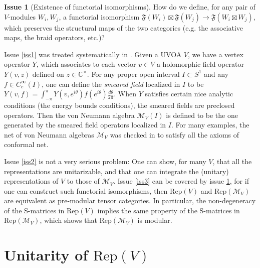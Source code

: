 \documentclass[10pt]{amsart}
\theoremstyle{definition}
\newtheorem{iss}{Issue}[section]
\theoremstyle{plain}
\newcommand{\Rep}{\mathrm{Rep}}
\begin{document}
\begin{iss}[Existence of functorial isomorphisms]\label{iss5}
How do we define, for any pair of $V$-modules $W_i,W_j$, a functorial isomorphism $\mathfrak F(W_i)\boxtimes\mathfrak F(W_j)\rightarrow \mathfrak F(W_i\boxtimes W_j)$, which preserves the structural maps of the two categories (e.g. the associative maps, the braid operators, etc.)?
\end{iss}

Issue \ref{iss1} was treated systematically in \cite{CKLW}. Given a UVOA $V$, we have a vertex operator $Y$, which associates to each vector $v\in V$ a holomorphic field operator $Y(v,z)$ defined on $z\in\mathbb C^\times$. For any proper open interval $I\subset S^1$ and any $f\in C^\infty_c(I)$, one can define the \emph{smeared field} localized in $I$ to be $Y(v,f)=\int_{-\pi}^{\pi} Y(v,e^{i\theta})f(e^{i\theta})\frac{d\theta}{2\pi}$.
When $Y$ satisfies certain nice analytic conditions (the energy bounds conditions), the smeared fields are preclosed operators. Then the von Neumann algebra $\mathcal M_V(I)$ is defined to be the one generated by the smeared field operators localized in $I$. For many examples, the net of von Neumann algebras $\mathcal M_V$ was checked in \cite{CKLW} to satisfy all the axioms of conformal net.

Issue \ref{iss2} is not a very serious problem: One can show, for many  $V$, that all the representations are unitarizable, and that one can integrate the (unitary) representations of $V$ to those of $\mathcal M_V$.  Issue \ref{iss3} can be covered by issue \ref{iss5}, for if one can construct such functorial isomorphisms, then $\Rep(V)$ and $\Rep(\mathcal M_V)$ are equivalent as pre-modular tensor categories. In particular, the non-degeneracy of the S-matrices in $\Rep(V)$ implies the same property of the S-matrices in $\Rep(\mathcal M_V)$, which shows that $\Rep(\mathcal M_V)$ is modular.







\section{Unitarity of $\Rep(V)$}
\end{document}
